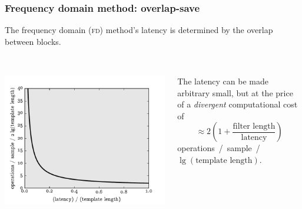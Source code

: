 \documentclass{beamer}
\begin{document}
\begin{frame}
	\frametitle{Frequency domain method: overlap-save}
	The frequency domain (\textsc{fd}) method's latency is determined by the overlap between blocks. \\~\\
	\begin{columns}
		\begin{column}{0.6\textwidth}
			\includegraphics[width=\textwidth]{figures/fd_latency}
		\end{column}
		\begin{column}{0.4\textwidth}

			The latency can be made arbitrary small, but at the price of a {\color{ink3}\emph{divergent}} computational cost of
			\begin{equation*}
				\approx 2 \left(1 + \frac{\textrm{filter length}}{\textrm{latency}}\right)
			\end{equation*}
			operations~/~sample~/ $\lg (\textrm{template length})$.
		\end{column}
	\end{columns}
\end{frame}
\end{document}
